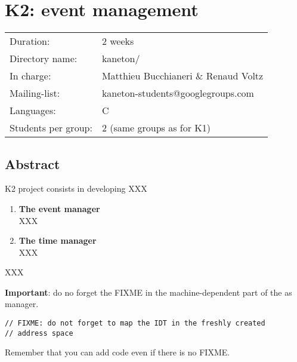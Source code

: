 
%
%

\chapter{K2: event management}

%
%

\begin{tabular}{p{7cm}l}
Duration: & 2 weeks \\
Directory name: & kaneton/ \\
In charge: & Matthieu Bucchianeri \& Renaud Voltz\\
Mailing-list: & kaneton-students@googlegroups.com \\
Languages: & C \\
Students per group: & 2 (same groups as for K1) \\
\end{tabular}

\section{Abstract}

K2 project consists in developing XXX

\begin{enumerate}
  \item
    {\bf The event manager}\\
    XXX
  \item
    {\bf The time manager}\\
    XXX
\end{enumerate}

XXX

\textbf{Important}: do no forget the FIXME in the machine-dependent
part of the as manager.

\begin{verbatim}
// FIXME: do not forget to map the IDT in the freshly created
// address space
\end{verbatim}

Remember that you can add code even if there is no FIXME.

%
%

\newpage

